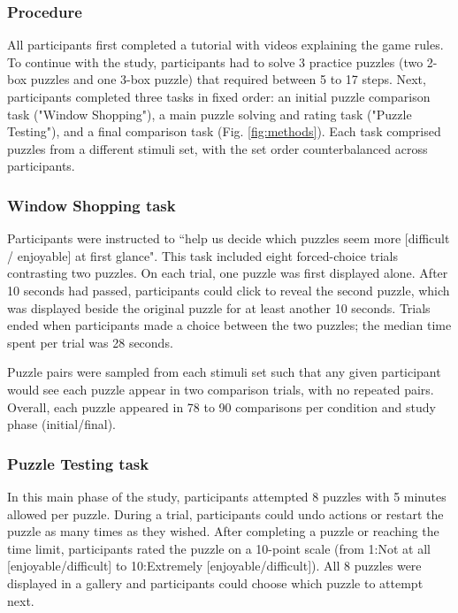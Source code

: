 \documentclass[10pt,letterpaper]{article}
\begin{document}
\subsubsection{Procedure}

All participants first completed a tutorial with videos explaining the game rules. To continue with the study, participants had to solve 3 practice puzzles (two 2-box puzzles and one 3-box puzzle) that required between 5 to 17 steps. Next, participants completed three tasks in fixed order: an initial puzzle comparison task ("Window Shopping"), a main puzzle solving and rating task ("Puzzle Testing"), and a final comparison task (Fig. \ref{fig:methods}). Each task comprised puzzles from a different stimuli set, with the set order counterbalanced across participants.

\subsubsection{Window Shopping task}
Participants were instructed to ``help us decide which puzzles seem more [difficult / enjoyable] at first glance". This task included eight forced-choice trials contrasting two puzzles. On each trial, one puzzle was first displayed alone. After 10 seconds had passed, participants could click to reveal the second puzzle, which was displayed beside the original puzzle for at least another 10 seconds. Trials ended when participants made a choice between the two puzzles; the median time spent per trial was 28 seconds. 

Puzzle pairs were sampled from each stimuli set such that any given participant would see each puzzle appear in two comparison trials, with no repeated pairs. Overall, each puzzle appeared in 78 to 90 comparisons per condition and study phase (initial/final).

\subsubsection{Puzzle Testing task}

In this main phase of the study, participants attempted 8 puzzles with 5 minutes allowed per puzzle.  
During a trial, participants could undo actions or restart the puzzle as many times as they wished. 
After completing a puzzle or reaching the time limit, participants rated the puzzle on a 10-point scale (from 1:Not at all [enjoyable/difficult] to 10:Extremely [enjoyable/difficult]).
All 8 puzzles were displayed in a gallery and participants could choose which puzzle to attempt next. 
\end{document}
